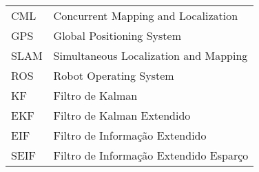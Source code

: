 \begin{longtable}{ll}
CML & Concurrent Mapping and Localization \\
GPS & Global Positioning System \\
SLAM & Simultaneous Localization and Mapping\\
ROS & Robot Operating System\\
KF & Filtro de Kalman\\
EKF & Filtro de Kalman Extendido\\
EIF & Filtro de Informação Extendido\\
SEIF & Filtro de Informação Extendido Esparço\\

\end{longtable}


